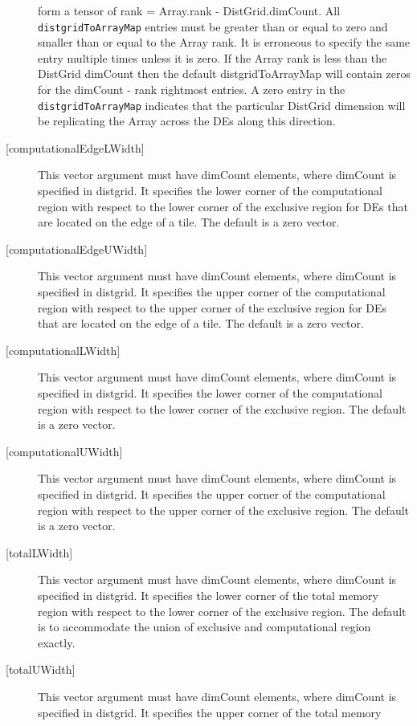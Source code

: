 \begin{description}
   form a tensor of rank = Array.rank - DistGrid.dimCount. 
   All {\tt distgridToArrayMap} entries must be greater than or equal 
   to zero and smaller than or equal to the Array rank. It is erroneous 
   to specify the same entry multiple times unless it is zero. 
   If the Array rank is less than the DistGrid dimCount then the default 
   distgridToArrayMap will contain zeros for the dimCount - rank 
   rightmost entries. A zero entry in the {\tt distgridToArrayMap} 
   indicates that the particular DistGrid dimension will be replicating 
   the Array across the DEs along this direction. 
   \item[{[computationalEdgeLWidth]}] 
   This vector argument must have dimCount elements, where dimCount is 
   specified in distgrid. It specifies the lower corner of the computational 
   region with respect to the lower corner of the exclusive region for DEs 
   that are located on the edge of a tile. 
   The default is a zero vector. 
   \item[{[computationalEdgeUWidth]}] 
   This vector argument must have dimCount elements, where dimCount is 
   specified in distgrid. It specifies the upper corner of the computational 
   region with respect to the upper corner of the exclusive region for DEs 
   that are located on the edge of a tile. 
   The default is a zero vector. 
   \item[{[computationalLWidth]}] 
   This vector argument must have dimCount elements, where dimCount is 
   specified in distgrid. It specifies the lower corner of the computational 
   region with respect to the lower corner of the exclusive region. 
   The default is a zero vector. 
   \item[{[computationalUWidth]}] 
   This vector argument must have dimCount elements, where dimCount is 
   specified in distgrid. It specifies the upper corner of the computational 
   region with respect to the upper corner of the exclusive region. 
   The default is a zero vector. 
   \item[{[totalLWidth]}] 
   This vector argument must have dimCount elements, where dimCount is 
   specified in distgrid. It specifies the lower corner of the total memory 
   region with respect to the lower corner of the exclusive region. 
   The default is to accommodate the union of exclusive and computational 
   region exactly. 
   \item[{[totalUWidth]}] 
   This vector argument must have dimCount elements, where dimCount is 
   specified in distgrid. It specifies the upper corner of the total memory 

\end{description}
